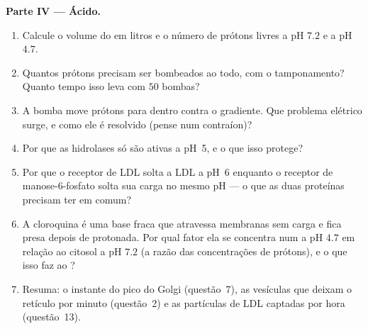 \begin{problem}
\medskip
\noindent\textbf{Parte IV --- Ácido.}
\begin{enumerate}[resume]
  \item Calcule o volume do  em litros e o número de prótons
        livres a pH $7.2$ e a pH $4.7$.
  \item Quantos prótons precisam ser bombeados ao todo, com o
        tamponamento? Quanto tempo isso leva com $50$ bombas?
  \item A bomba move prótons para dentro contra o gradiente. Que
        problema elétrico surge, e como ele é resolvido (pense num
        contraíon)?
  \item Por que as hidrolases só são ativas a pH~5, e o que isso
        protege?
  \item Por que o receptor de LDL solta a LDL a pH~6 enquanto o
        receptor de manose-6-fosfato solta sua carga no mesmo pH ---
        o que as duas proteínas precisam ter em comum?
  \item A cloroquina é uma base fraca que atravessa membranas sem
        carga e fica presa depois de protonada. Por qual fator ela se
        concentra num  a pH $4.7$ em relação ao citosol a pH
        $7.2$ (a razão das concentrações de prótons), e o que isso faz
        ao ?
  \item Resuma: o instante do pico do Golgi (questão~7), as vesículas
        que deixam o retículo por minuto (questão~2) e as partículas de
        LDL captadas por hora (questão~13).
\end{enumerate}
\end{problem}
